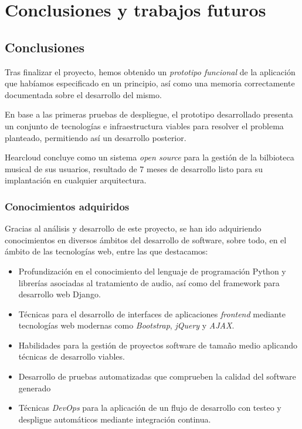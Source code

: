 \chapter{Conclusiones y trabajos futuros}
\label{cap:conclusiones}

\section{Conclusiones}

Tras finalizar el proyecto, hemos obtenido un \textit{prototipo funcional} de la aplicación que habíamos especificado en un principio, así como una memoria correctamente documentada sobre el desarrollo del mismo.

En base a las primeras pruebas de despliegue, el prototipo desarrollado presenta un conjunto de tecnologías e infraestructura viables para resolver el problema planteado, permitiendo así un desarrollo posterior.

Hearcloud concluye como un sistema \textit{open source} para la gestión de la bilbioteca musical de sus usuarios, resultado de 7 meses de desarrollo listo para su implantación en cualquier arquitectura.

\subsection{Conocimientos adquiridos}
Gracias al análisis y desarrollo de este proyecto, se han ido adquiriendo conocimientos en diversos ámbitos del desarrollo de software, sobre todo, en el ámbito de las tecnologías web, entre las que destacamos:

\begin{itemize}
	\item Profundización en el conocimiento del lenguaje de programación Python y librerías asociadas al tratamiento de audio, así como del framework para desarrollo web Django.
	\item Técnicas para el desarrollo de interfaces de aplicaciones \textit{frontend} mediante tecnologías web modernas como \textit{Bootstrap}, \textit{jQuery} y \textit{AJAX}.
	\item Habilidades para la gestión de proyectos software de tamaño medio aplicando técnicas de desarrollo viables.
	\item Desarrollo de pruebas automatizadas que comprueben la calidad del software generado
	\item Técnicas \textit{DevOps} para la aplicación de un flujo de desarrollo con testeo y despligue automáticos mediante integración continua.
\end{itemize} 

